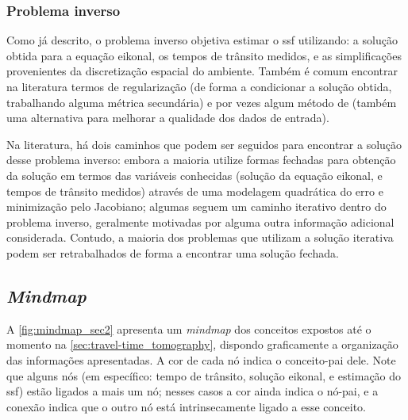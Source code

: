 \subsubsection*{Problema inverso}

Como já descrito, o problema inverso objetiva estimar o \gls{ssf} utilizando: a solução obtida para a equação eikonal, os tempos de trânsito medidos, e as simplificações provenientes da discretização espacial do ambiente. Também é comum encontrar na literatura termos de regularização (de forma a condicionar a solução obtida, trabalhando alguma métrica secundária) e por vezes algum método de  (também uma alternativa para melhorar a qualidade dos dados de entrada).

Na literatura, há dois caminhos que podem ser seguidos para encontrar a solução desse problema inverso: embora a maioria utilize formas fechadas para obtenção da solução em termos das variáveis conhecidas (solução da equação eikonal, e tempos de trânsito medidos) através de uma modelagem quadrática do erro e minimização pelo Jacobiano; algumas seguem um caminho iterativo dentro do problema inverso, geralmente motivadas por alguma outra informação adicional considerada. Contudo, a maioria dos problemas que utilizam a solução iterativa podem ser retrabalhados de forma a encontrar uma solução fechada.

\subsection{\textsl{Mindmap}}

A \cref{fig:mindmap_sec2} apresenta um \textsl{mindmap} dos conceitos expostos até o momento na \cref{sec:travel-time_tomography}, dispondo graficamente a organização das informações apresentadas. A cor de cada nó indica o conceito-pai dele. Note que alguns nós (em específico: tempo de trânsito, solução eikonal, e estimação do \gls{ssf}) estão ligados a mais um nó; nesses casos a cor ainda indica o nó-pai, e a conexão indica que o outro nó está intrinsecamente ligado a esse conceito.



